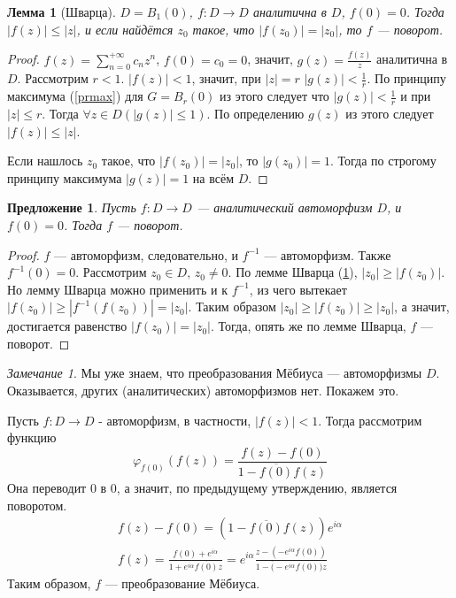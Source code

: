 \documentclass[12pt]{article}
\newcounter{cnt}
\theoremstyle{thmnote}
\newtheorem{lemma}[cnt]{Лемма}
\newtheorem{proposition}[cnt]{Предложение}
\theoremstyle{remark}
\newtheorem*{remark}{Замечание}
\theoremstyle{defnote}
\begin{document}
\begin{lemma}[Шварца]
\label{lmsch}
    $D = B_1(0)$, $f: D \to D$ аналитична в $D$, $f(0) = 0$. Тогда $|f(z)| \leq |z|$, и если найдётся $z_0$ такое, что $|f(z_0)| = |z_0|$, то $f$ --- поворот.
\end{lemma}
\begin{proof}
    $f(z) = \sum_{n = 0}^{+\infty} c_n z^n$, $f(0) = c_0 = 0$, значит, $g(z) = \frac{f(z)}{z}$ аналитична в $D$. Рассмотрим $r < 1$. $|f(z)| < 1$, значит, при $|z| = r$ $|g(z)| < \frac{1}{r}$. По принципу максимума (\ref{prmax}) для $G = B_r(0)$ из этого следует что $|g(z)| < \frac{1}{r}$ и при $|z| \leq r$. Тогда $\forall z \in D (|g(z)| \leq 1)$. По определению $g(z)$ из этого следует $|f(z)| \leq |z|$.

    Если нашлось $z_0$ такое, что $|f(z_0)| = |z_0|$, то $|g(z_0)| = 1$. Тогда по строгому принципу максимума $|g(z)| = 1$ на всём $D$. 
\end{proof}

\begin{proposition}
    Пусть $f: D \to D$ --- аналитический автоморфизм $D$, и $f(0) = 0$. Тогда $f$ --- поворот.
\end{proposition}
\begin{proof}
    $f$ --- автоморфизм, следовательно, и $f^{-1}$ --- автоморфизм. Также $f^{-1}(0) = 0$. Рассмотрим $z_0 \in D,\, z_0 \neq 0$. По лемме Шварца (\ref{lmsch}), $|z_0| \geq |f(z_0)|$. Но лемму Шварца можно применить и к $f^{-1}$, из чего вытекает $|f(z_0)| \geq |f^{-1}(f(z_0))| = |z_0|$. Таким образом $|z_0| \geq |f(z_0)| \geq |z_0|$, а значит, достигается равенство $|f(z_0)| = |z_0|$. Тогда, опять же по лемме Шварца, $f$ --- поворот.
\end{proof}

\begin{remark}
    Мы уже знаем, что преобразования Мёбиуса --- автоморфизмы $D$. Оказывается, других (аналитических) автоморфизмов нет. Покажем это.

    Пусть $f: D \to D$ - автоморфизм, в частности, $|f(z)| < 1$. Тогда рассмотрим функцию
    \begin{equation*}
        \varphi_{f(0)}(f(z)) = \frac{f(z) - f(0)}{1 - \overline{f(0)} f(z)}
    \end{equation*}
    Она переводит 0 в 0, а значит, по предыдущему утверждению, является поворотом.
    \begin{gather*}
        f(z) - f(0) = (1 - \overline{f(0)}f(z)) e^{i \alpha} \\
        f(z) = \frac{f(0) + e^{i \alpha}}{1 + e^{i \alpha} \overline{f(0)} z} = e^{i \alpha} \frac{z - (-e^{i \alpha} f(0))}{1 - \overline(-e^{i \alpha} f(0)) z}
    \end{gather*}
    Таким образом, $f$ --- преобразование Мёбиуса.
\end{remark}
\end{document}
